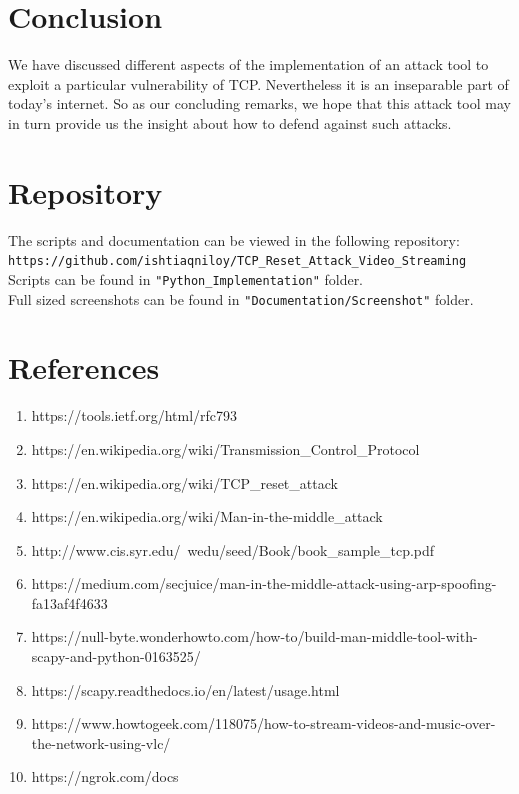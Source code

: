 \documentclass[14pt]{extarticle}
\begin{document}
\section{Conclusion}
    We have discussed different aspects of the implementation of an attack tool to exploit a particular vulnerability of TCP. Nevertheless it is an inseparable part of today's internet. So as our concluding remarks, we hope that this attack tool may in turn provide us the insight about how to defend against such attacks.
    

\section{Repository}
    The scripts and documentation can be viewed in the following repository: 
    \verb!https://github.com/ishtiaqniloy/TCP_Reset_Attack_Video_Streaming! \\
    Scripts can be found in \verb!"Python_Implementation"! folder. \\
    Full sized screenshots can be found in \verb!"Documentation/Screenshot"! folder.

\section{References}
    \begin{enumerate}
        \item https://tools.ietf.org/html/rfc793
        \item https://en.wikipedia.org/wiki/Transmission\_Control\_Protocol
        \item https://en.wikipedia.org/wiki/TCP\_reset\_attack
        \item https://en.wikipedia.org/wiki/Man-in-the-middle\_attack
        \item http://www.cis.syr.edu/~wedu/seed/Book/book\_sample\_tcp.pdf
        \item https://medium.com/secjuice/man-in-the-middle-attack-using-arp-spoofing-fa13af4f4633
        \item https://null-byte.wonderhowto.com/how-to/build-man-middle-tool-with-scapy-and-python-0163525/
        \item https://scapy.readthedocs.io/en/latest/usage.html
        \item https://www.howtogeek.com/118075/how-to-stream-videos-and-music-over-the-network-using-vlc/
        \item https://ngrok.com/docs
    \end{enumerate}
\end{document}
